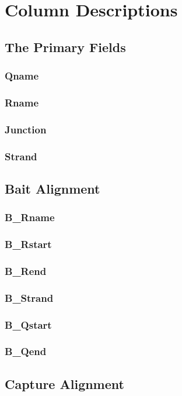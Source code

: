 \documentclass{article}
\begin{document}
\section{Column Descriptions}
\subsection{The Primary Fields}
\subsubsection*{Qname}
\subsubsection*{Rname}
\subsubsection*{Junction}
\subsubsection*{Strand}

\subsection{Bait Alignment}
\subsubsection*{B\_Rname}
\subsubsection*{B\_Rstart}
\subsubsection*{B\_Rend}
\subsubsection*{B\_Strand}
\subsubsection*{B\_Qstart}
\subsubsection*{B\_Qend}


\subsection{Capture Alignment}
\end{document}
